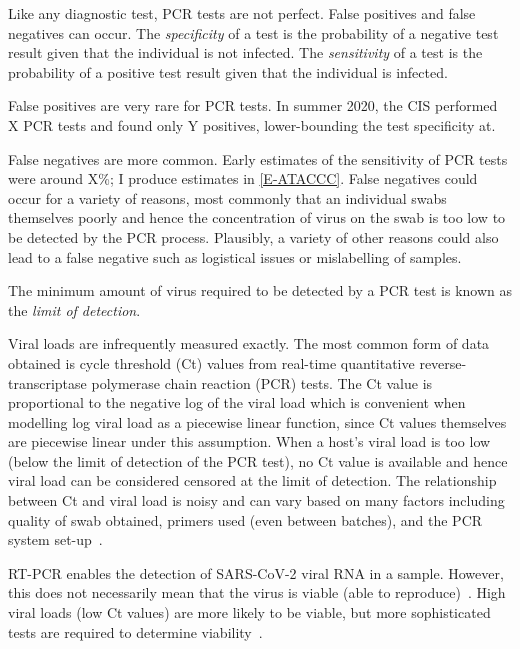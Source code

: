 \documentclass[thesis.tex]{subfiles}
\begin{document}
Like any diagnostic test, PCR tests are not perfect.
False positives and false negatives can occur.
The \emph{specificity} of a test is the probability of a negative test result given that the individual is not infected.
The \emph{sensitivity} of a test is the probability of a positive test result given that the individual is infected.

False positives are very rare for PCR tests.
In summer 2020, the CIS performed X PCR tests and found only Y positives, lower-bounding the test specificity at.

False negatives are more common.
Early estimates of the sensitivity of PCR tests were around X\%; I produce estimates in \cref{E-ATACCC}.
False negatives could occur for a variety of reasons, most commonly that an individual swabs themselves poorly and hence the concentration of virus on the swab is too low to be detected by the PCR process.
Plausibly, a variety of other reasons could also lead to a false negative such as logistical issues or mislabelling of samples.

The minimum amount of virus required to be detected by a PCR test is known as the \emph{limit of detection}.

Viral loads are infrequently measured exactly.
The most common form of data obtained is cycle threshold (Ct) values from real-time quantitative  reverse-transcriptase polymerase chain reaction (PCR) tests.
The Ct value is proportional to the negative log of the viral load which is convenient when modelling log viral load as a piecewise linear function, since Ct values themselves are piecewise linear under this assumption.
When a host's viral load is too low (below the limit of detection of the PCR test), no Ct value is available and hence viral load can be considered censored at the limit of detection.
The relationship between Ct and viral load is noisy and can vary based on many factors including quality of swab obtained, primers used (even between batches), and the PCR system set-up~\autocites{dahdouhCt,hanRTPCR}.

RT-PCR enables the detection of SARS-CoV-2 viral RNA in a sample.
However, this does not necessarily mean that the virus is viable (\ie able to reproduce)~\autocite{puhachSARSCoV2}.
High viral loads (low Ct values) are more likely to be viable, but more sophisticated tests are required to determine viability~\autocite{singanayagamDuration,puhachSARSCoV2,hakkiOnset}.
\end{document}
